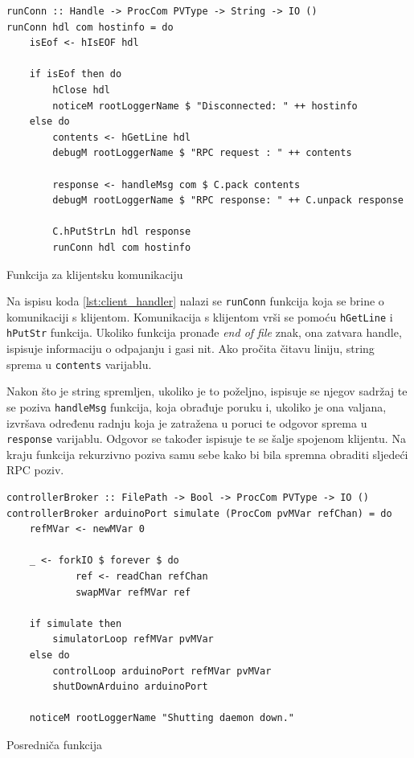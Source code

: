 \begin{listing}[H]
\centering
\begin{verbatim}
runConn :: Handle -> ProcCom PVType -> String -> IO ()
runConn hdl com hostinfo = do
    isEof <- hIsEOF hdl

    if isEof then do
        hClose hdl
        noticeM rootLoggerName $ "Disconnected: " ++ hostinfo
    else do
        contents <- hGetLine hdl
        debugM rootLoggerName $ "RPC request : " ++ contents

        response <- handleMsg com $ C.pack contents
        debugM rootLoggerName $ "RPC response: " ++ C.unpack response

        C.hPutStrLn hdl response
        runConn hdl com hostinfo
\end{verbatim}
\caption{Funkcija za klijentsku komunikaciju}
\label{lst:client_handler}
\end{listing}

Na ispisu koda \ref{lst:client_handler} nalazi se \texttt{runConn}
funkcija koja se brine o komunikaciji s klijentom. Komunikacija s klijentom
vrši se pomoću \texttt{hGetLine} i
\texttt{hPutStr} funkcija. Ukoliko funkcija pronađe \emph{end of
file} znak, ona zatvara handle, ispisuje informaciju o odpajanju i gasi nit. Ako
pročita čitavu liniju, string sprema u \texttt{contents} varijablu.

Nakon što je string spremljen, ukoliko je to poželjno, ispisuje se njegov sadržaj
te se poziva \texttt{handleMsg} funkcija, koja obrađuje poruku i,
ukoliko je ona valjana, izvršava određenu radnju koja je zatražena u poruci te
odgovor sprema u \texttt{response} varijablu. Odgovor se također
ispisuje te se šalje spojenom klijentu. Na kraju funkcija rekurzivno
poziva samu sebe kako bi bila spremna obraditi sljedeći RPC poziv.

\begin{listing}[H]
\centering
\begin{verbatim}
controllerBroker :: FilePath -> Bool -> ProcCom PVType -> IO ()
controllerBroker arduinoPort simulate (ProcCom pvMVar refChan) = do
    refMVar <- newMVar 0

    _ <- forkIO $ forever $ do
            ref <- readChan refChan
            swapMVar refMVar ref

    if simulate then
        simulatorLoop refMVar pvMVar
    else do
        controlLoop arduinoPort refMVar pvMVar
        shutDownArduino arduinoPort

    noticeM rootLoggerName "Shutting daemon down."
\end{verbatim}
\caption{Posredniča funkcija}
\label{lst:controler broker}
\end{listing}

